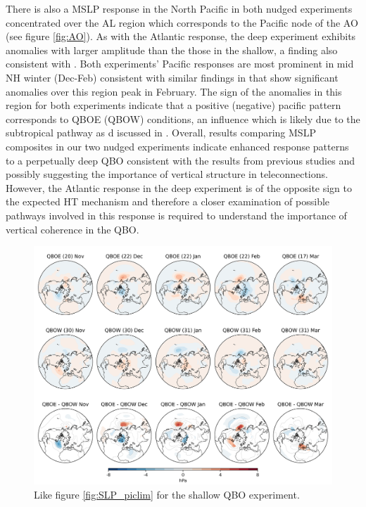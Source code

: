 There is also a MSLP response in the North Pacific in both nudged experiments concentrated over the AL region which corresponds to the Pacific node of the AO (see figure \ref{fig:AO}). As with the Atlantic response, the deep experiment exhibits anomalies with larger amplitude than the those in the shallow, a finding also consistent with \cite{andrewsObserved2019d}. Both experiments' Pacific responses are most prominent in mid NH winter (Dec-Feb) consistent with similar findings in \cite{graySurface2018b} that show significant anomalies over this region peak in February. The sign of the anomalies in this region for both experiments indicate that a positive (negative) pacific pattern corresponds to QBOE (QBOW) conditions, an influence which is likely due to the subtropical pathway as d
iscussed in \cite{graySurface2018b}. Overall, results comparing MSLP composites in our two nudged experiments indicate enhanced response patterns to a perpetually deep QBO consistent with the results from previous studies \citep{graySurface2018b, andrewsObserved2019d} and possibly suggesting the importance of vertical structure in teleconnections. However, the Atlantic response in the deep experiment is of the opposite sign to the expected HT mechanism and therefore a closer examination of possible pathways involved in this response is required to understand the importance of vertical coherence in the QBO.

\begin{figure}[h!]
\begin{center}
\noindent\includegraphics[width =0.8\linewidth]{Figures/Figures-deepQBO/SLP_composites_individual_months_QBO_phases_U_s_50hPa_5thresh.png}
\caption[]{Like figure \ref{fig:SLP_piclim} for the shallow QBO experiment.}
\label{fig:SLP_shallow}
\end{center}
\end{figure}
\newpage

